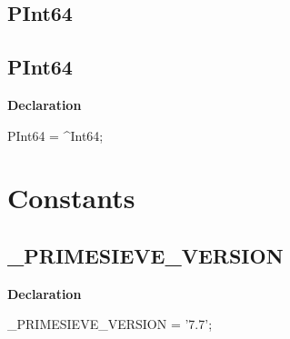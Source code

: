 \documentclass{report}
\newif\ifpdf
\begin{document}
\subsection*{\large{\textbf{PInt64}}\normalsize\hspace{1ex}\hrulefill}
\else
\subsection*{PInt64}
\fi
\label{primesieve-PInt64}
\begin{list}{}{
\setlength{\itemindent}{0cm}
\setlength{\listparindent}{0cm}
\setlength{\leftmargin}{\evensidemargin}
\addtolength{\leftmargin}{\tmplength}
\settowidth{\labelsep}{X}
\addtolength{\leftmargin}{\labelsep}
\setlength{\labelwidth}{\tmplength}
}
\item[\textbf{Declaration}\hfill]
\ifpdf
\begin{flushleft}
\fi
\begin{ttfamily}
PInt64 = {\^{}}Int64;\end{ttfamily}

\ifpdf
\end{flushleft}
\fi

\end{list}
\section{Constants}
\ifpdf
\subsection*{\large{\textbf{{\_}PRIMESIEVE{\_}VERSION}}\normalsize\hspace{1ex}\hrulefill}
\else
\subsection*{{\_}PRIMESIEVE{\_}VERSION}
\fi
\label{primesieve-_PRIMESIEVE_VERSION}
\begin{list}{}{
\setlength{\itemindent}{0cm}
\setlength{\listparindent}{0cm}
\setlength{\leftmargin}{\evensidemargin}
\addtolength{\leftmargin}{\tmplength}
\settowidth{\labelsep}{X}
\addtolength{\leftmargin}{\labelsep}
\setlength{\labelwidth}{\tmplength}
}
\item[\textbf{Declaration}\hfill]
\ifpdf
\begin{flushleft}
\fi
\begin{ttfamily}
{\_}PRIMESIEVE{\_}VERSION = '7.7';\end{ttfamily}

\ifpdf
\end{flushleft}
\fi

\end{list}
\ifpdf
\end{document}
